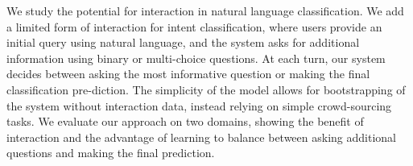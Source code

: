 We study  the  potential  for  interaction  in  natural  language  classification. We  add a limited form of interaction for intent classification,  where users provide an initial query using natural language, and the system asks for additional  information  using  binary  or multi-choice  questions.   At  each  turn,  our  system decides between asking the most informative question or making the final classification pre-diction.   The  simplicity  of  the  model  allows for bootstrapping of the system without interaction data,  instead relying on simple crowd-sourcing tasks.  We evaluate our approach on two  domains,  showing  the  benefit  of  interaction and the advantage of learning to balance between asking additional questions and making the final prediction.
